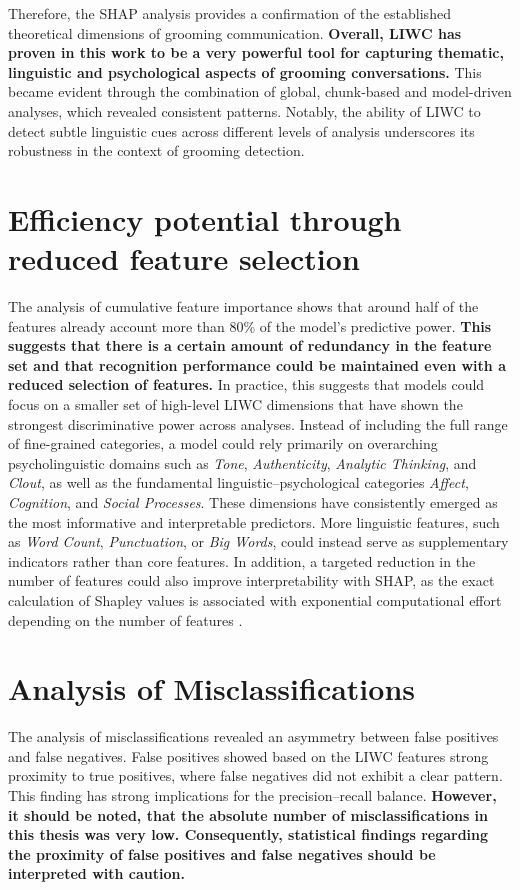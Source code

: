 Therefore, the SHAP analysis provides a confirmation of the established theoretical dimensions of grooming communication. \textbf{Overall, LIWC has proven in this work to be a very powerful tool for capturing thematic, linguistic and psychological aspects of grooming conversations.} This became evident through the combination of global, chunk-based and model-driven analyses, which revealed consistent patterns. Notably, the ability of LIWC to detect subtle linguistic cues across different levels of analysis underscores its robustness in the context of grooming detection.

\section{Efficiency potential through reduced feature selection}

The analysis of cumulative feature importance shows that around half of the features already account more than 80\% of the model's predictive power. \textbf{This suggests that there is a certain amount of redundancy in the feature set and that recognition performance could be maintained even with a reduced selection of features.} In practice, this suggests that models could focus on a smaller set of high-level LIWC dimensions that have shown the strongest discriminative power across analyses. Instead of including the full range of fine-grained categories, a model could rely primarily on overarching psycholinguistic domains such as \textit{Tone}, \textit{Authenticity}, \textit{Analytic Thinking}, and \textit{Clout}, as well as the fundamental linguistic–psychological categories \textit{Affect}, \textit{Cognition}, and \textit{Social Processes}. These dimensions have consistently emerged as the most informative and interpretable predictors. More linguistic features, such as \textit{Word Count}, \textit{Punctuation}, or \textit{Big Words}, could instead serve as supplementary indicators rather than core features. In addition, a targeted reduction in the number of features could also improve interpretability with SHAP, as the exact calculation of Shapley values is associated with exponential computational effort depending on the number of features \cite{fryer2021shapley}.

\section{Analysis of Misclassifications}

The analysis of misclassifications revealed an asymmetry between false positives and false negatives. False positives showed based on the LIWC features strong proximity to true positives, where false negatives did not exhibit a clear pattern. This finding has strong implications for the precision–recall balance. \textbf{However, it should be noted, that the absolute number of misclassifications in this thesis was very low. Consequently, statistical findings regarding the proximity of false positives and false negatives should be interpreted with caution.}

